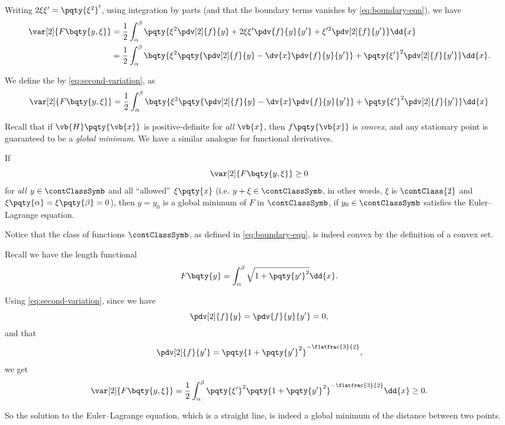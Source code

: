Writing \(2 \xi \xi' = \pqty{\xi^2}'\), using integration by parts (and that the boundary terms vanishes by \eqref{eq:boundary-eqn}), we have
\begin{equation}
    \label{eq:second-variation}%
    \begin{aligned}
        \var[2]{F\bqty{y, \xi}} &= \frac{1}{2} \int_{\alpha}^{\beta} \pqty{\xi^2 \pdv[2]{f}{y} + 2 \xi \xi' \pdv{f}{y}{y'} + \xi'^2 \pdv[2]{f}{{y'}}} \dd{x} \\
        &= \frac{1}{2} \int_{\alpha}^{\beta} \bqty{\xi^2 \pqty{\pdv[2]{f}{y} - \dv{x} \pdv{f}{y}{y'}} + \pqty{\xi'}^2 \pdv[2]{f}{{y'}}} \dd{x}.
    \end{aligned}
\end{equation}

\begin{definition}
    We define the  by \eqref{eq:second-variation}, as
    \[
        \var[2]{F\bqty{y, \xi}} = \frac{1}{2} \int_{\alpha}^{\beta} \bqty{\xi^2 \pqty{\pdv[2]{f}{y} - \dv{x} \pdv{f}{y}{y'}} + \pqty{\xi'}^2 \pdv[2]{f}{{y'}}} \dd{x}
    \]
\end{definition}

Recall that if \(\vb{H} \pqty{\vb{x}}\) is positive-definite for \emph{all} \(\vb{x}\), then \(f\pqty{\vb{x}}\) is \emph{convex}, and any stationary point is guaranteed to be a \emph{global minimum}. We have a similar analogue for functional derivatives.

\begin{theorem}
    If
    \[
        \var[2]{F\bqty{y, \xi}} \geq 0
    \]
    for \emph{all} \(y \in \contClassSymb\) and all ``allowed'' \(\xi\pqty{x}\) (i.e. \(y + \xi \in \contClassSymb\), in other words, \(\xi\) is \(\contClass{2}\) and \(\xi\pqty{\alpha} = \xi\pqty{\beta} = 0\)), then \(y = y_0\) is a global minimum of \(F\) in \(\contClassSymb\), if \(y_0 \in \contClassSymb\) satisfies the Euler--Lagrange equation.
\end{theorem}

Notice that the class of functions \(\contClassSymb\), as defined in \eqref{eq:boundary-eqn}, is indeed convex by the definition of a convex set.

\begin{example}
    Recall we have the length functional
    \[
        F\bqty{y} = \int_{\alpha}^{\beta} \sqrt{1 + \pqty{y'}^2} \dd{x}.
    \]

    Using \eqref{eq:second-variation}, since we have
    \[
        \pdv[2]{f}{y} = \pdv{f}{y}{y'} = 0,
    \]
    and that
    \[
        \pdv[2]{f}{{y'}} = \pqty{1 + \pqty{y'}^2}^{- \flatfrac{3}{2}},
    \]
    we get
    \[
        \var[2]{F\bqty{y, \xi}} = \frac{1}{2} \int_{\alpha}^{\beta} \pqty{\xi'}^2 \pqty{1 + \pqty{y'}^2}^{- \flatfrac{3}{2}} \dd{x} \geq 0.
    \]

    So the solution to the Euler--Lagrange equation, which is a straight line, is indeed a global minimum of the distance between two points.
\end{example}

